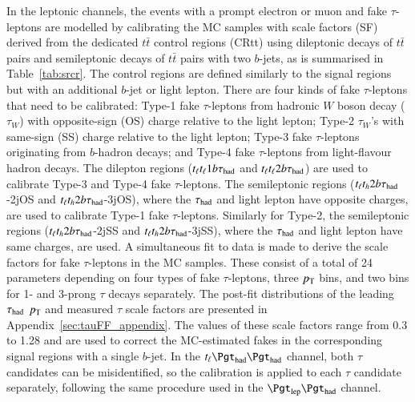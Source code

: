 In the leptonic channels, the events with a prompt electron or muon and fake $\tau$-leptons are modelled by calibrating the MC samples with scale factors (SF)
derived from the dedicated $t\bar t$
control regions (CRtt) using dileptonic decays of $t\bar t$ pairs and semileptonic decays of $t\bar t$ pairs with two
$b$-jets, as is summarised in Table~\ref{tab:srcr}. The control regions are defined similarly to the signal regions but with an additional $b$-jet or light lepton. 	
There are four kinds of fake $\tau$-leptons that need to be calibrated: Type-1 fake $\tau$-leptons from hadronic $W$ boson decay ($\tau_{W}$) %
with opposite-sign (OS) charge relative to the light lepton;
Type-2 $\tau_{W}$'s with same-sign (SS) charge relative to the light lepton; Type-3 fake $\tau$-leptons originating from $b$-hadron decays; and Type-4 fake $\tau$-leptons from light-flavour hadron decays.
The dilepton regions ($t_{\ell}t_{\ell}1b\tau_\text{had}$ and $t_{\ell}t_{\ell}2b\tau_\text{had}$) are used to calibrate Type-3 and Type-4 fake $\tau$-leptons. The semileptonic
regions ($t_{\ell}t_h2b\tau_\text{had}$-2jOS and $t_{\ell}t_h2b\tau_\text{had}$-3jOS), where the $\tau_\text{had}$ and light lepton have opposite charges, are used to calibrate Type-1 fake $\tau$-leptons.
Similarly for Type-2, the semileptonic regions ($t_{\ell}t_h2b\tau_\text{had}$-2jSS and $t_{\ell}t_h2b\tau_\text{had}$-3jSS), where the $\tau_\text{had}$ and light lepton have same charges, are used.
A simultaneous fit to data is made to derive the scale factors for fake $\tau$-leptons in the MC samples. These consist of a total of 24 parameters
depending on four types of fake $\tau$-leptons, three $p_{\text{T}}$ bins, and two bins for 1- and 3-prong $\tau$ decays separately. The post-fit distributions of the
leading $\tau_\text{had}$ $p_{\text{T}}$ and measured $\tau$ scale factors are presented in Appendix~\ref{sec:tauFF_appendix}. 
The values of these scale factors range from 0.3 to 1.28 and are used to correct the MC-estimated fakes in the corresponding  signal regions with a single $b$-jet.
In the $t_{\ell}\thadhad$ channel, both $\tau$ candidates can be misidentified, so the calibration is applied to each $\tau$ candidate separately, following the same procedure used in the $\tlhad$ channel.
